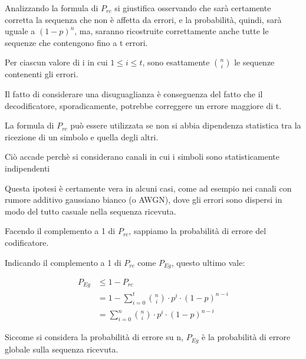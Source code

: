 Analizzando la formula di $P_{rc}$ si giustifica osservando che sarà certamente corretta la sequenza che non è affetta da errori, 
e la probabilità, quindi, sarà uguale a $(1-p)^{n}$, 
ma, saranno ricostruite correttamente anche tutte le sequenze che contengono fino a t errori. \newline 

Per ciascun valore di i in cui $1 \le i \le t$, 
sono esattamente $\binom{n}{i}$ le sequenze contenenti gli errori. \newline 

Il fatto di considerare una disuguaglianza è conseguenza del fatto che il decodificatore, sporadicamente, 
potrebbe correggere un errore maggiore di t. \newline 

La formula di $P_{rc}$ può essere utilizzata se non si abbia dipendenza statistica tra la ricezione di un simbolo e quella degli altri. \newline 

\begin{tcolorbox}
Ciò accade perchè si considerano canali in cui i simboli sono statisticamente indipendenti
\end{tcolorbox}

Questa ipotesi è certamente vera in alcuni casi, 
come ad esempio nei canali con rumore additivo gaussiano bianco (o AWGN), 
dove gli errori sono dispersi in modo del tutto casuale nella sequenza ricevuta. \newline 

Facendo il complemento a 1 di $P_{rc}$, 
sappiamo la probabilità di errore del codificatore. \newline 

Indicando il complemento a 1 di $P_{rc}$ come $P_{Eg}$, 
questo ultimo vale: 

{
    \Large 
    \begin{equation}
        \begin{split}
            P_{Eg}
            &\le 
            1 - P_{rc}
            \\
            &=
            1 - \sum_{i = 0}^{t} 
        \binom{n}{i} \cdot p^{i} \cdot (1 - p)^{n-i}
        \\
        &= 
        \sum_{i = 0}^{n} 
        \binom{n}{i} \cdot p^{i} \cdot (1 - p)^{n-i}
        \end{split}
    \end{equation}
}

Siccome si considera la probabilità di errore su n, 
$P_{Eg}$ è la probabilità di errore globale sulla sequenza ricevuta. \newline 

